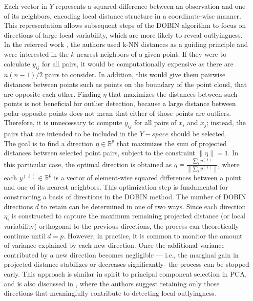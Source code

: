 \documentclass[12pt]{article}
\begin{document}
Each vector in \( Y \) represents a squared difference between an observation and one of its neighbors, encoding local distance structure in a coordinate-wise manner. This representation allows subsequent steps of the DOBIN algorithm to focus on directions of large local variability, which are more likely to reveal outlyingness.\\ 
In the referred work \citet{Kandanaarachchi2021}, the authors used k-NN distances as a guiding principle and were interested in the $k$-nearest neighbors of a given point. If they were to calculate $y_{ij}$ for all pairs, it would be computationally expensive as there are $n(n - 1)/2$ pairs to consider. In addition, this would give them pairwise distances between points such as points on the boundary of the point cloud, that are opposite each other. Finding $\eta$ that maximizes the distances between such points is not beneficial for outlier detection, because a large distance between polar opposite points does not mean that either of those points are outliers. Therefore, it is unnecessary to compute $y_{ij}$ for all pairs of $x_i$ and $x_j$; instead, the pairs that are intended to be included in the $Y-space$ should be selected.\\


The goal is to find a direction \( \eta \in \mathbb{R}^p \) that maximizes the sum of projected distances between selected point pairs, subject to the constraint \( \|\eta\| = 1 \). In this particular case, the optimal direction is obtained as $
\eta = \frac{\sum_\ell y^{(\ell)}}{\left\| \sum_\ell y^{(\ell)} \right\|}$, where each \( y^{(\ell)} \in \mathbb{R}^p \) is a vector of element-wise squared differences between a point and one of its nearest neighbors. This optimization step is fundamental for constructing a basis of directions in the DOBIN method. The number of DOBIN directions \( d \) to retain can be determined in one of two ways. Since each direction \( \eta_i \) is constructed to capture the maximum remaining projected distance (or local variability) orthogonal to the previous directions, the process can theoretically continue until \( d = p \). However, in practice, it is common to monitor the amount of variance explained by each new direction. Once the additional variance contributed by a new direction becomes negligible — i.e., the marginal gain in projected distance stabilizes or decreases significantly- the process can be stopped early. This approach is similar in spirit to principal component selection in PCA, and is also discussed in \citet{Kandanaarachchi2021}, where the authors suggest retaining only those directions that meaningfully contribute to detecting local outlyingness.
\end{document}
